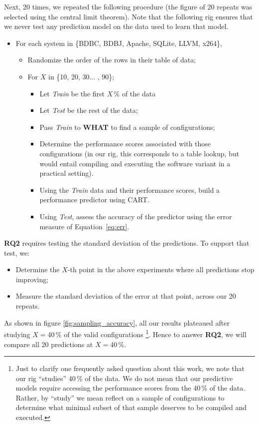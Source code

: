 \documentclass{sig-alternative}
\newcommand{\bi}{\begin{itemize}}%
\newcommand{\ei}{\end{itemize}}
\newcommand{\eq}[1]{Equation~\ref{eq:#1}}
\newcommand{\what}{{\bf WHAT }}
\begin{document}
Next, 20 times, we repeated the following procedure (the figure of 20 repeats was
selected using the central limit theorem). Note that the following rig ensures that
we never test any prediction model on the data used to learn that model.
\bi
\item For each system in \{BDBC, BDBJ, Apache, SQLite, LLVM, x264\},
\bi
\item Randomize the order of the rows in their table of data;
\item For $X$ in \{10, 20, 30... , 90\};
\bi
\item Let {\em Train} be the first $X$\,\% of the data 
\item Let {\em Test} be the rest of the data;
\item Pass {\em Train} to \what to find a sample of configurations;
\item Determine the performance scores associated with those configurations (in our rig, this corresponds to a table lookup, but would entail compiling and executing the software variant in a practical setting).
\item Using the {\em Train}  data and their performance scores, build a performance predictor using CART.
\item Using {\em Test}, assess the accuracy of the predictor using the error 
measure of \eq{err}.
\ei
\ei
\ei
{\bf RQ2} requires testing the standard deviation of the predictions. To support that test, we:
\bi
\item Determine the $X$-th point in the above experiments where all predictions stop improving;
\item Measure the standard deviation of the error at that point, across our 20 repeats.
\ei
As shown in figure \ref{fig:sampling_accuracy}, all our results plateaued after studying $X=40$\,\% of the valid configurations
 \footnote{Just to clarify one frequently asked question about this work, we note
that our rig ``studies'' 40\,\% of the data. We do not mean that our predictive models
 require accessing the performance scores from the 40\,\% of the data. Rather, by ``study'' we mean   reflect 
 on a sample of configurations to determine what minimal subset of that
sample deserves to be compiled and executed.}.
 Hence to answer {\bf RQ2}, we will compare all 20 predictions at $X=40$\,\%.
 
\end{document}
